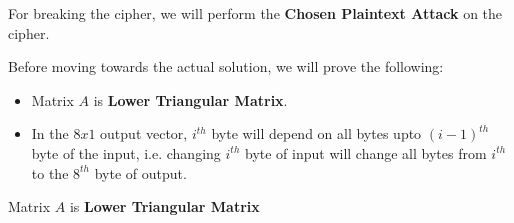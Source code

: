 \documentclass[10pt,twoside]{article}
\begin{document}
For breaking the cipher, we will perform the \textbf{Chosen Plaintext Attack} on the cipher. \newline

Before moving towards the actual solution, we will prove the following:
\begin{itemize}
  \setlength\itemsep{0em}
  \item Matrix $A$ is \textbf{Lower Triangular Matrix}.
  \item In the $8x1$ output vector, $i^{th}$ byte will depend on all bytes upto $(i-1)^{th}$ byte of the input, i.e. changing $i^{th}$ byte of input will change all bytes from $i^{th}$ to the $8^{th}$ byte of output. \newline
\end{itemize}

\begin{lemma} \label{lem:1}
  Matrix $A$ is \textbf{Lower Triangular Matrix}
\end{lemma}
\end{document}
